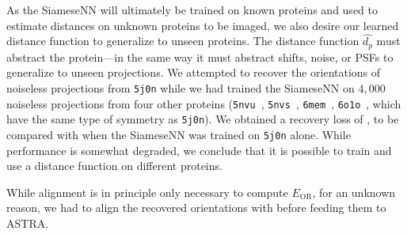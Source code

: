 As the SiameseNN will ultimately be trained on known proteins and used to estimate distances on unknown proteins to be imaged,
we also desire our learned distance function to generalize to unseen proteins.
The distance function $\widehat{d_p}$ must abstract the protein---in the same way it must abstract shifts, noise, or PSFs to generalize to unseen projections.
We attempted to recover the orientations of noiseless projections from \texttt{5j0n} while we had trained the SiameseNN on $4,000$ noiseless projections from four other proteins (\texttt{5nvu}~\cite{ZHANG20171303}, \texttt{5nvs}~\cite{ZHANG20171303}, \texttt{6mem}~\cite{iwai2018unique}, \texttt{6o1o}~\cite{liu2019target}, which have the same type of symmetry as \texttt{5j0n}).
We obtained a recovery loss of ,
to be compared with  when the SiameseNN was trained on \texttt{5j0n} alone.
While performance is somewhat degraded, we conclude that it is possible to train and use a distance function on different proteins.



While alignment is in principle only necessary to compute $E_\text{OR}$, for an unknown reason, we had to align the recovered orientations with  before feeding them to ASTRA\@.

